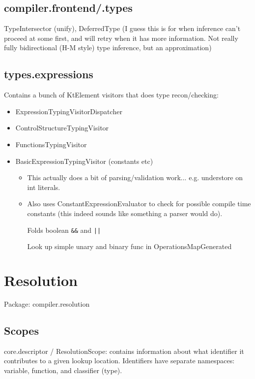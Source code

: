 \documentclass{article}
\begin{document}
\subsection{compiler.frontend/.types}

TypeIntersector (unify), DeferredType (I guess this is for when inference can't proceed at some first, and will retry when it has more information. Not really fully bidirectional (H-M style) type inference, but an approximation)

\subsection{types.expressions}

Contains a bunch of KtElement visitors that does type recon/checking:
\begin{itemize}
\item ExpressionTypingVisitorDispatcher
\item ControlStructureTypingVisitor
\item FunctionsTypingVisitor
\item BasicExpressionTypingVisitor (constants etc)
\begin{itemize}
  \item This actually does a bit of parsing/validation work... e.g. understore on int literals.
  \item Also uses ConstantExpressionEvaluator to check for possible compile time constants (this indeed sounds like something a parser would do).
  
  Folds boolean \texttt{\&\&} and \texttt{||}

  Look up simple unary and binary func in OperationsMapGenerated
\end{itemize}
\end{itemize}

\section{Resolution}
\label{sec:reso}

Package: compiler.resolution

\subsection{Scopes}

core.descriptor / ResolutionScope: contains information about what identifier it contributes to a given lookup location. Identifiers have separate namespaces: variable, function, and classifier (type).
\end{document}
